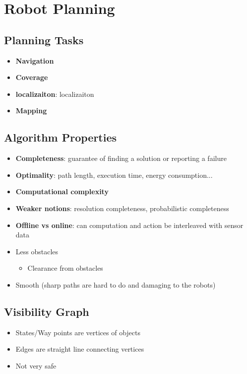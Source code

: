\section{Robot Planning}

\subsection{Planning Tasks}

  \begin{itemize}
    \item \textbf{Navigation}
    \item \textbf{Coverage}
    \item \textbf{\Gls{localizaiton}}: \glsdesc{localizaiton}
    \item \textbf{Mapping}
  \end{itemize}

\subsection{Algorithm Properties}

  \begin{itemize}
    \item \textbf{Completeness}: guarantee of finding a solution or reporting a
    failure
    \item \textbf{Optimality}: path length, execution time, energy consumption...
    \item \textbf{Computational complexity}
    \item \textbf{Weaker notions}: resolution completeness, probabilistic completeness
    \item \textbf{Offline vs online}: can computation and action be interleaved with
    sensor data
    \item Less obstacles
    \begin{itemize}
      \item Clearance from obstacles
    \end{itemize}

    \item Smooth (sharp paths are hard to do and damaging to the robots)
  \end{itemize}

\subsection{Visibility Graph}

  \begin{itemize}
    \item States/Way points are vertices of objects
    \item Edges are straight line connecting vertices
    \item Not very safe
  \end{itemize}

